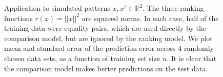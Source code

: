 \documentclass{article}
\newcommand{\RR}{\mathbb R}
\begin{document}
\begin{figure}[b!]
  \hskip -1cm
  
  \vskip -0.7cm
  \caption{Application to simulated patterns $x,x'\in\RR^2$. The three
    ranking functions $r(x)=||x||^2$ are squared norms. In each case,
    half of the training data were equality pairs, which are used
    directly by the comparison model, but are ignored by the ranking
    model. We plot mean and standard error of the prediction error
    across 4 randomly chosen data sets, as a function of training set
    size $n$. It is clear that the comparison model makes better
    predictions on the test data.}
  \label{fig:simulation-samples}
\end{figure}


%   

\end{document}

